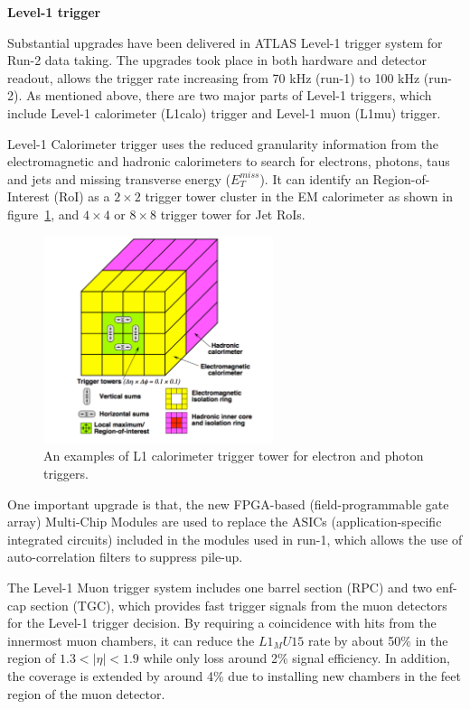 \textbf{Level-1 trigger}

Substantial upgrades have been delivered in ATLAS Level-1 trigger system for Run-2 data taking.
The upgrades took place in both hardware and detector readout, allows the trigger rate increasing from 70 kHz (run-1) to 100 kHz (run-2).
As mentioned above, there are two major parts of Level-1 triggers, which include Level-1 calorimeter (L1calo) trigger and Level-1 muon (L1mu) trigger.

Level-1 Calorimeter trigger uses the reduced granularity information from the electromagnetic and hadronic calorimeters to search for electrons, photons, taus and jets and missing transverse energy ($E_{T}^{miss}$).
It can identify an Region-of-Interest (RoI) as a $2 \times 2$ trigger tower cluster in the EM calorimeter as shown in figure~\ref{fig:trig_tower}, 
and $4 \times 4$ or $8 \times 8$ trigger tower for Jet RoIs.
\begin{figure}[!htb]
  \centering
  \includegraphics[width=0.6\textwidth]{figures/Detector/trig_tower.png}
  \caption{An examples of L1 calorimeter trigger tower for electron and photon triggers\cite{Pasztor:2063746}.}
  \label{fig:trig_tower}
\end{figure}
One important upgrade is that, the new FPGA-based (field-programmable gate array) Multi-Chip Modules are used to replace the ASICs (application-specific integrated circuits) included in the modules used in run-1,
which allows the use of auto-correlation filters to suppress pile-up.

The Level-1 Muon trigger system includes one barrel section (RPC) and two enf-cap section (TGC), which provides fast trigger signals from the muon detectors for the Level-1 trigger decision.
By requiring a coincidence with hits from the innermost muon chambers, it can reduce the $L1_MU15$ rate by about 50\% in the region of $1.3 < |\eta| < 1.9$ while only loss around 2\% signal efficiency.
In addition, the coverage is extended by around 4\% due to installing new chambers in the feet region of the muon detector.


